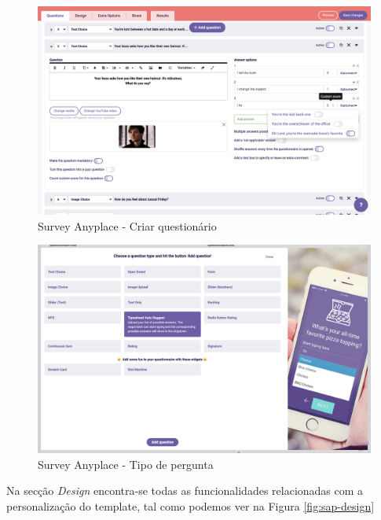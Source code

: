 \begin{figure}[ht!]
	\begin{center}
		\includegraphics[width=1\textwidth]{img/sap/create}
		\caption{Survey Anyplace - Criar questionário}
		\label{fig:sap-create}
	\end{center}
\end{figure}

\begin{figure}[ht!]
	\begin{center}
		\includegraphics[width=1\textwidth]{img/sap/type}
		\caption{Survey Anyplace - Tipo de pergunta}
		\label{fig:sap-type}
	\end{center}
\end{figure}
\pagebreak

Na secção \textit{Design} encontra-se todas as funcionalidades relacionadas com a personalização do template, tal como podemos ver na Figura \ref{fig:sap-design}

